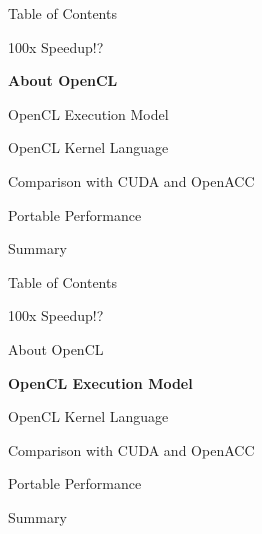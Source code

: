 







\begin{frame}{Table of Contents}
 \begin{block}{100x Speedup!?} \end{block}
 \begin{block}{\textbf{About OpenCL}} \end{block}
 \begin{block}{OpenCL Execution Model} \end{block}
 \begin{block}{OpenCL Kernel Language} \end{block}
 \begin{block}{Comparison with CUDA and OpenACC} \end{block}
 \begin{block}{Portable Performance} \end{block}
 \begin{block}{Summary} \end{block}
\end{frame}





\begin{frame}{Table of Contents}
 \begin{block}{100x Speedup!?} \end{block}
 \begin{block}{About OpenCL} \end{block}
 \begin{block}{\textbf{OpenCL Execution Model}} \end{block}
 \begin{block}{OpenCL Kernel Language} \end{block}
 \begin{block}{Comparison with CUDA and OpenACC} \end{block}
 \begin{block}{Portable Performance} \end{block}
 \begin{block}{Summary} \end{block}
\end{frame}





